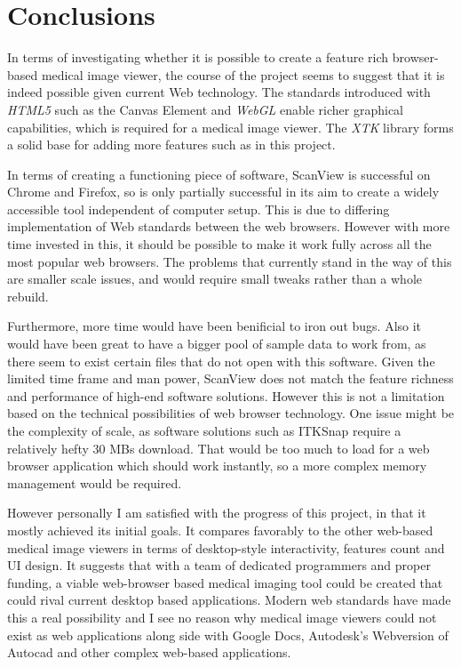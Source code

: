 \documentclass[a4paper,11pt,twoside]{article}
\begin{document}
\section{Conclusions}

In terms of investigating whether it is possible to create a feature rich browser-based medical image viewer, the course of the project seems to suggest that it is indeed possible given current Web technology. The standards introduced with \textit{HTML5} such as the Canvas Element and \textit{WebGL} enable richer graphical capabilities, which is required for a medical image viewer. The \textit{XTK} library forms a solid base for adding more features such as in this project. 

In terms of creating a functioning piece of software, ScanView is successful on Chrome and Firefox, so is only partially successful in its aim to create a widely accessible tool independent of computer setup. This is due to differing implementation of Web standards between the web browsers. However with more time invested in this, it should be possible to make it work fully across all the most popular web browsers. The problems that currently stand in the way of this are smaller scale issues, and would require small tweaks rather than a whole rebuild.

Furthermore, more time would have been benificial to iron out bugs. Also it would have been great to have a bigger pool of sample data to work from, as there seem to exist certain files that do not open with this software. Given the limited time frame and man power, ScanView does not match the feature richness and performance of high-end software solutions. However this is not a limitation based on the technical possibilities of web browser technology. One issue might be the complexity of scale, as software solutions such as ITKSnap require a relatively hefty 30 MBs download. That would be too much to load for a web browser application which should work instantly, so a more complex memory management would be required.

However personally I am satisfied with the progress of this project, in that it mostly achieved its initial goals. It compares favorably to the other web-based medical image viewers in terms of desktop-style interactivity, features count and UI design. It suggests that with a team of dedicated programmers and proper funding, a viable web-browser based medical imaging tool could be created that could rival current desktop based applications. Modern web standards have made this a real possibility and I see no reason why medical image viewers could not exist as web applications along side with Google Docs, Autodesk's Webversion of Autocad and other complex web-based applications.
\end{document}

